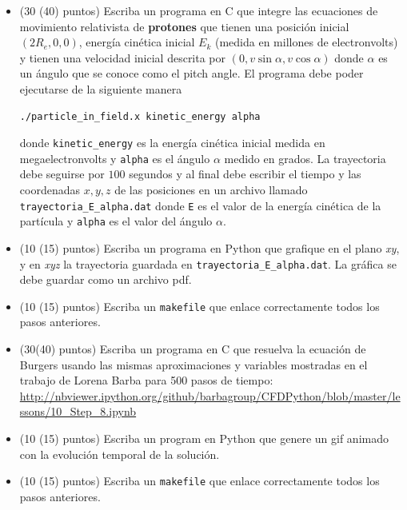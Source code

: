 \documentclass[11pt,letterpaper]{exam}
\begin{document}
\begin{questions}
\begin{itemize}
\item (30 (40) puntos) Escriba un programa en C que integre las ecuaciones
  de movimiento relativista de {\bf protones} que tienen una
  posici\'on inicial $(2R_e,0,0)$, energ\'ia cin\'etica inicial
  $E_{k}$ (medida en millones de electronvolts) y tienen una velocidad
  inicial descrita por $(0,v\sin\alpha, v\cos\alpha)$ donde $\alpha$
  es un \'angulo que se conoce como el pitch angle. El programa debe
  poder ejecutarse de la siguiente manera 
\begin{verbatim}
./particle_in_field.x kinetic_energy alpha
\end{verbatim}
donde \verb"kinetic_energy" es la energ\'ia cin\'etica inicial medida
en megaelectronvolts y \verb"alpha" es el \'angulo $\alpha$ medido en
grados. La trayectoria debe seguirse por $100$ segundos y al final
debe escribir el tiempo y las coordenadas $x,y,z$ de las posiciones en un archivo
llamado \verb"trayectoria_E_alpha.dat" donde \verb"E" es el valor de la
energ\'ia cin\'etica de la part\'icula y \verb"alpha" es el valor del
\'angulo $\alpha$.

\item (10 (15) puntos) Escriba un programa en Python que grafique en el
  plano {\it xy}, y en {\it xyz} la trayectoria guardada en
  \verb"trayectoria_E_alpha.dat". La gr\'afica se debe guardar como un
  archivo pdf.

\item (10 (15) puntos) Escriba un \verb"makefile" que enlace correctamente
  todos los pasos anteriores.
\end{itemize}






\begin{itemize}
\item (30(40) puntos) Escriba un programa en C que resuelva la
  ecuaci\'on de Burgers usando las mismas aproximaciones y variables
  mostradas en el trabajo de Lorena Barba para 500 pasos de tiempo:\\
\url{http://nbviewer.ipython.org/github/barbagroup/CFDPython/blob/master/lessons/10_Step_8.ipynb}

\item  (10 (15) puntos) Escriba un program en Python que genere un gif
  animado con la evoluci\'on temporal de la soluci\'on.

\item (10 (15) puntos) Escriba un \verb"makefile" que enlace
  correctamente todos los pasos anteriores.
\end{itemize}


\end{questions}
\end{document}
